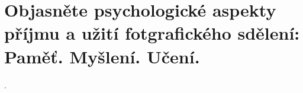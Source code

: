 \section{Objasněte psychologické aspekty příjmu a užití fotgrafického sdělení: Paměť. Myšlení. Učení.}.